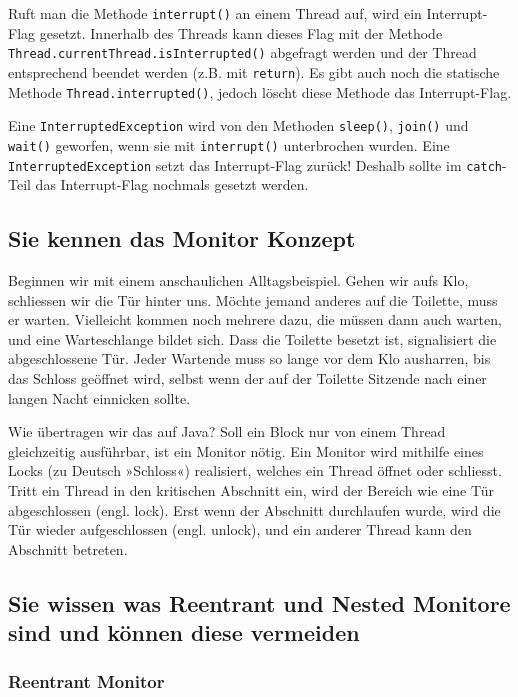 Ruft man die Methode \texttt{interrupt()} an einem Thread auf, wird ein Interrupt-Flag gesetzt. Innerhalb des Threads kann dieses Flag mit der Methode \texttt{Thread.currentThread.isInterrupted()} abgefragt werden und der Thread entsprechend beendet werden (z.B. mit \texttt{return}). Es gibt auch noch die statische Methode \texttt{Thread.interrupted()}, jedoch löscht diese Methode das Interrupt-Flag.

Eine \texttt{InterruptedException} wird von den Methoden \texttt{sleep()}, \texttt{join()} und \texttt{wait()} geworfen, wenn sie mit \texttt{interrupt()} unterbrochen wurden. Eine \texttt{InterruptedException} setzt das Interrupt-Flag zurück! Deshalb sollte im \texttt{catch}-Teil das Interrupt-Flag nochmals gesetzt werden.

\subsection{Sie kennen das Monitor Konzept}

Beginnen wir mit einem anschaulichen Alltagsbeispiel. Gehen wir aufs Klo, schliessen wir die Tür hinter uns. Möchte jemand anderes auf die Toilette, muss er warten. Vielleicht kommen noch mehrere dazu, die müssen dann auch warten, und eine Warteschlange bildet sich. Dass die Toilette besetzt ist, signalisiert die abgeschlossene Tür. Jeder Wartende muss so lange vor dem Klo ausharren, bis das Schloss geöffnet wird, selbst wenn der auf der Toilette Sitzende nach einer langen Nacht einnicken sollte.

Wie übertragen wir das auf Java? Soll ein Block nur von einem Thread gleichzeitig ausführbar, ist ein Monitor nötig. Ein Monitor wird mithilfe eines Locks (zu Deutsch »Schloss«) realisiert, welches ein Thread öffnet oder schliesst. Tritt ein Thread in den kritischen Abschnitt ein, wird der Bereich wie eine Tür abgeschlossen (engl. lock). Erst wenn der Abschnitt durchlaufen wurde, wird die Tür wieder aufgeschlossen (engl. unlock), und ein anderer Thread kann den Abschnitt betreten.

\subsection{Sie wissen was Reentrant und Nested Monitore sind und können diese vermeiden}

\subsubsection{Reentrant Monitor}


